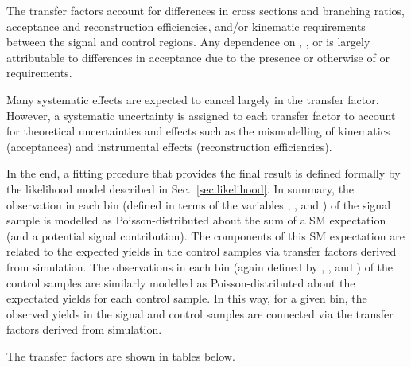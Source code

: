 The transfer factors account for differences in cross sections and
branching ratios, acceptance and reconstruction efficiencies, and/or
kinematic requirements between the signal and control regions. Any
dependence on \njet, \nb, or \HT is largely attributable to
differences in acceptance due to the presence or otherwise of \alphat
or \mht requirements.

Many systematic effects are expected to cancel largely in the transfer
factor. However, a systematic uncertainty is assigned to each transfer
factor to account for theoretical uncertainties and effects such as
the mismodelling of kinematics (\eg acceptances) and instrumental
effects (\eg reconstruction efficiencies).

In the end, a fitting prcedure that provides the final result is
defined formally by the likelihood model described in
Sec.~\ref{sec:likelihood}. In summary, the observation in each bin
(defined in terms of the variables \njet, \nb, and \scalht) of the
signal sample is modelled as Poisson-distributed about the sum of a SM
expectation (and a potential signal contribution). The components of
this SM expectation are related to the expected yields in the control
samples via transfer factors derived from simulation. The observations
in each bin (again defined by \njet, \nb, and \scalht) of the control
samples are similarly modelled as Poisson-distributed about the
expectated yields for each control sample. In this way, for a given
bin, the observed yields in the signal and control samples are
connected via the transfer factors derived from simulation. 



The transfer factors are shown in tables below.


